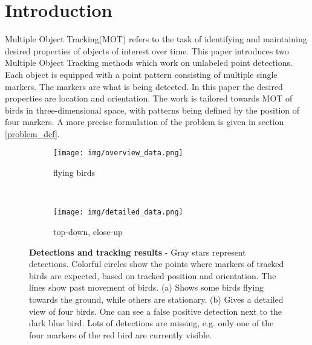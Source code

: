 \documentclass[12pt,a4paper]{article}
\begin{document}
\section{Introduction}
Multiple Object Tracking(MOT) refers to the task of identifying and maintaining desired properties of objects of interest over time.
This paper introduces two Multiple Object Tracking methods which work on unlabeled point detections. Each object is equipped with a point pattern consisting of multiple single markers. The markers are what is being detected. In this paper the desired properties are location and orientation. The work is tailored towards MOT of birds in three-dimensional space, with patterns being defined by the position of four markers. A more precise formulation of the problem is given in section \ref{problem_def}.
\begin{figure}[!htbp]
	\centering
	\begin{subfigure}[b]{0.42\textwidth}
		\texttt{[image: img/overview\_data.png]}
		\caption{flying birds}
	\end{subfigure} ~
	\begin{subfigure}[b]{0.455\textwidth}
			\texttt{[image: img/detailed\_data.png]}
		\caption{top-down, close-up}
	\end{subfigure}
	\vspace{\baselineskip}
	\caption{\textbf{Detections and tracking results} - Gray stars represent detections. Colorful circles show the points where markers of tracked birds are expected, based on tracked position and orientation. The lines show past movement of birds. (a) Shows some birds flying towards the ground, while others are stationary. (b) Gives a detailed view of four birds. One can see a false positive detection next to the dark blue bird. Lots of detections are missing, e.g. only one of the four markers of the red bird are currently visible.}
    \label{data_impression}
\end{figure}
\end{document}

